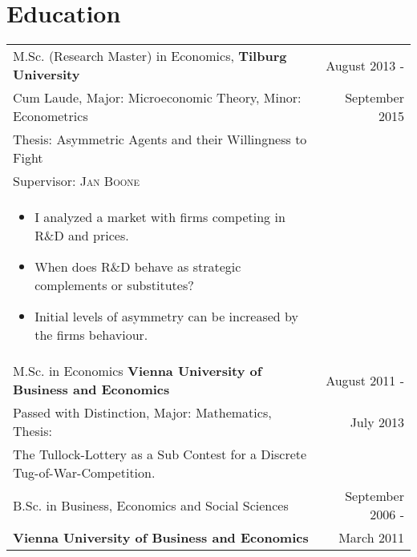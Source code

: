 \documentclass[a4paper,10pt]{article} %
\begin{document}
\section{Education}

\begin{tabular}{p{12cm} r}

	M.Sc. (Research Master) in Economics, \textbf{Tilburg University}&  August 2013 - \\
	Cum Laude, Major: Microeconomic Theory, Minor: Econometrics& September 2015\phantom{ -}\\
	Thesis: Asymmetric Agents and their Willingness to Fight \\
	\small Supervisor: \textsc{Jan Boone}\\
	\begin{itemize}[noitemsep]
		\item I analyzed a market with firms competing in R\&D and prices.
		\item When does R\&D behave as strategic complements or substitutes?
		\item Initial levels of asymmetry can be increased by the firms behaviour.
	\end{itemize}&\hspace{1cm}\\

	M.Sc. in Economics \textbf{Vienna University of Business and Economics}& August 2011 -  \\
	Passed with Distinction, Major: Mathematics, Thesis:& July 2013\phantom{ -}\\
	{The Tullock-Lottery as a Sub Contest for a Discrete Tug-of-War-Competition.} \hspace{1cm}\\
	
	B.Sc. in Business, Economics and Social Sciences& September 2006 - \\ 
	\normalsize\textbf{Vienna University of Business and Economics}& March 2011\phantom{ -}\\
\end{tabular}\vspace{1cm} \\ \hspace{1cm}

\end{document}
